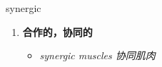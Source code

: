 
\begin{frame}
{\huge synergic}
\begin{center}
\begin{enumerate}\Large
  \item \textbf{合作的，协同的}
  \begin{itemize}
    \item \em{\Large{synergic muscles 协同肌肉}}
  \end{itemize}
\end{enumerate}
\end{center}
\end{frame}
